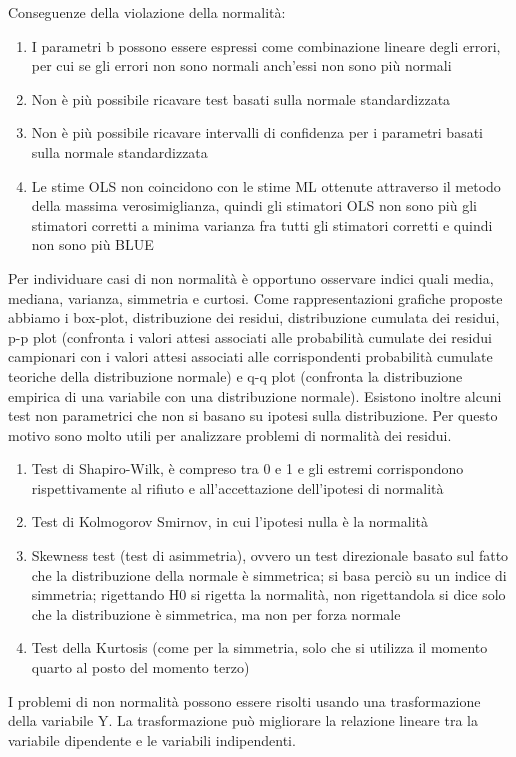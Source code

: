 \documentclass[a4page, 11pt]{article}
\begin{document}
Conseguenze della violazione della normalità:
\begin{enumerate}[noitemsep]
\item I parametri b possono essere espressi come combinazione lineare degli errori, per cui se gli errori non sono normali anch’essi non sono più normali
\item Non è più possibile ricavare test basati sulla normale standardizzata
\item Non è più possibile ricavare intervalli di confidenza per i parametri basati sulla normale standardizzata
\item Le stime OLS non coincidono con le stime ML ottenute attraverso il metodo della massima verosimiglianza, quindi gli stimatori OLS non sono più gli stimatori corretti a minima varianza fra tutti gli stimatori corretti e quindi non sono più BLUE
\end{enumerate}
Per individuare casi di non normalità è opportuno osservare indici quali media, mediana, varianza, simmetria e curtosi. Come rappresentazioni grafiche proposte abbiamo i box-plot, distribuzione dei residui, distribuzione cumulata dei residui, p-p plot (confronta i valori attesi associati alle probabilità cumulate dei residui campionari con i valori attesi associati alle corrispondenti probabilità cumulate teoriche della distribuzione normale) e q-q plot (confronta la distribuzione empirica di una variabile con una distribuzione normale). 
Esistono inoltre alcuni test non parametrici che non si basano su ipotesi sulla distribuzione. Per questo motivo sono molto utili per analizzare problemi di normalità dei residui.
\begin{enumerate}[noitemsep]
\item Test di Shapiro-Wilk, è compreso tra 0 e 1 e gli estremi corrispondono rispettivamente al rifiuto e all’accettazione dell’ipotesi di normalità
\item Test di Kolmogorov Smirnov, in cui l’ipotesi nulla è la normalità
\item Skewness test (test di asimmetria), ovvero un test direzionale basato sul fatto che la distribuzione della normale è simmetrica; si basa perciò su un indice di simmetria; rigettando H0 si rigetta la normalità, non rigettandola si dice solo che la distribuzione è simmetrica, ma non per forza normale
\item Test della Kurtosis (come per la simmetria, solo che si utilizza il momento quarto al posto del momento terzo)
\end{enumerate}
I problemi di non normalità possono essere risolti usando una trasformazione della variabile Y. La trasformazione può migliorare la relazione lineare tra la variabile dipendente e le variabili indipendenti.
\end{document}
